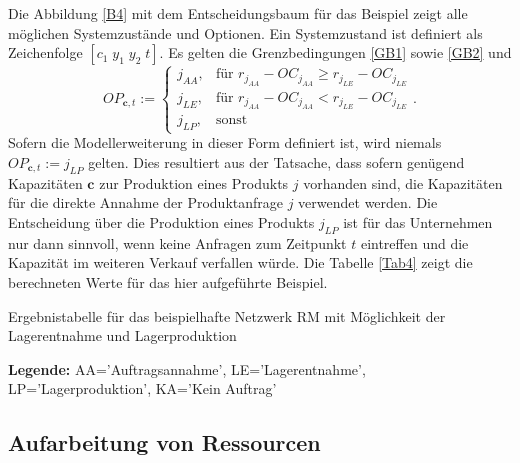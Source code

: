 Die Abbildung \ref{B4} mit dem Entscheidungsbaum für das Beispiel zeigt alle möglichen Systemzustände und Optionen. Ein Systemzustand ist definiert als Zeichenfolge $[c_{1}\; y_{1}\; y_{2}\;t]$. Es gelten die Grenzbedingungen \eqref{GB1} sowie \eqref{GB2} und
\begin{equation}\label{GB4}
     OP_{\textbf{c}, t}:=\left\{\begin{array}{lll} j_{AA}, & \text{für } r_{j_{AA}} - OC_{j_{AA}} \ge r_{j_{LE}} - OC_{j_{LE}}\\
         j_{LE}, & \text{für } r_{j_{AA}} - OC_{j_{AA}} < r_{j_{LE}} - OC_{j_{LE}}\\
         j_{LP}, & \text{sonst}\end{array}\right. .
\end{equation}
Sofern die Modellerweiterung in dieser Form definiert ist, wird niemals $OP_{\textbf{c}, t}:=j_{LP}$ gelten. Dies resultiert aus der Tatsache, dass sofern genügend Kapazitäten $\textbf{c}$ zur Produktion eines Produkts $j$ vorhanden sind, die Kapazitäten für die direkte Annahme der Produktanfrage $j$ verwendet werden. Die Entscheidung über die Produktion eines Produkts $j_{LP}$ ist für das Unternehmen nur dann sinnvoll, wenn keine Anfragen zum Zeitpunkt $t$ eintreffen und die Kapazität im weiteren Verkauf verfallen würde. Die Tabelle \ref{Tab4} zeigt die berechneten Werte für das hier aufgeführte Beispiel.
\begin{table}
\begin{footnotesize}
    \caption{Ergebnistabelle für das beispielhafte Netzwerk RM mit Möglichkeit der Lagerentnahme und Lagerproduktion} \label{Tab4}
    \vspace*{3mm}
\begin{center}
      {\footnotesize \textbf{Legende:} AA='Auftragsannahme', LE='Lagerentnahme', LP='Lagerproduktion', KA='Kein Auftrag'} 
      \end{center}
\end{footnotesize}
\end{table}

\subsection{Aufarbeitung von Ressourcen}


